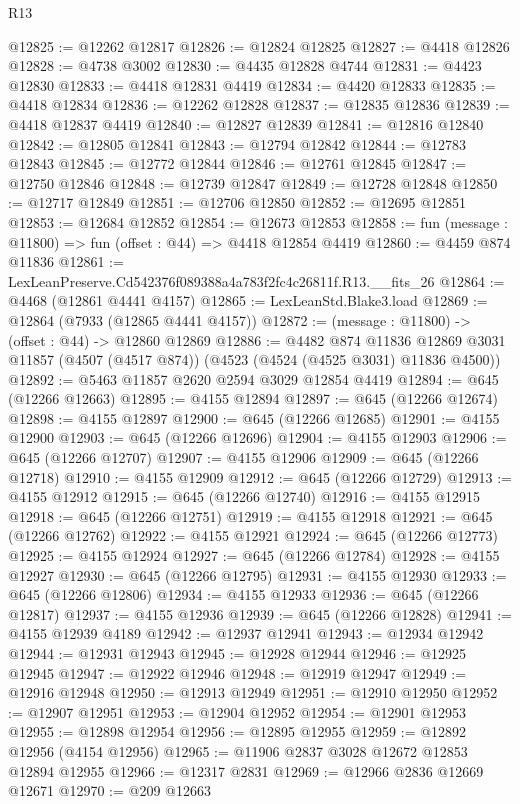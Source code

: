 \begin{lexlean}{R13}
\begin{coremodule}
@12825 := @12262 @12817
@12826 := @12824 @12825
@12827 := @4418 @12826
@12828 := @4738 @3002
@12830 := @4435 @12828 @4744
@12831 := @4423 @12830
@12833 := @4418 @12831 @4419
@12834 := @4420 @12833
@12835 := @4418 @12834
@12836 := @12262 @12828
@12837 := @12835 @12836
@12839 := @4418 @12837 @4419
@12840 := @12827 @12839
@12841 := @12816 @12840
@12842 := @12805 @12841
@12843 := @12794 @12842
@12844 := @12783 @12843
@12845 := @12772 @12844
@12846 := @12761 @12845
@12847 := @12750 @12846
@12848 := @12739 @12847
@12849 := @12728 @12848
@12850 := @12717 @12849
@12851 := @12706 @12850
@12852 := @12695 @12851
@12853 := @12684 @12852
@12854 := @12673 @12853
@12858 := fun (message : @11800) => fun (offset : @44) => @4418 @12854 @4419
@12860 := @4459 @874 @11836
@12861 := LexLeanPreserve.Cd542376f089388a4a783f2fc4c26811f.R13.__fits_26
@12864 := @4468 (@12861 @4441 @4157)
@12865 := LexLeanStd.Blake3.load
@12869 := @12864 (@7933 (@12865 @4441 @4157))
@12872 := (message : @11800) -> (offset : @44) -> @12860 @12869
@12886 := @4482
    @874
    @11836
    @12869
    @3031
    @11857
    (@4507 (@4517 @874))
    (@4523 (@4524 (@4525 @3031) @11836 @4500))
@12892 := @5463 @11857 @2620 @2594 @3029 @12854 @4419
@12894 := @645 (@12266 @12663)
@12895 := @4155 @12894
@12897 := @645 (@12266 @12674)
@12898 := @4155 @12897
@12900 := @645 (@12266 @12685)
@12901 := @4155 @12900
@12903 := @645 (@12266 @12696)
@12904 := @4155 @12903
@12906 := @645 (@12266 @12707)
@12907 := @4155 @12906
@12909 := @645 (@12266 @12718)
@12910 := @4155 @12909
@12912 := @645 (@12266 @12729)
@12913 := @4155 @12912
@12915 := @645 (@12266 @12740)
@12916 := @4155 @12915
@12918 := @645 (@12266 @12751)
@12919 := @4155 @12918
@12921 := @645 (@12266 @12762)
@12922 := @4155 @12921
@12924 := @645 (@12266 @12773)
@12925 := @4155 @12924
@12927 := @645 (@12266 @12784)
@12928 := @4155 @12927
@12930 := @645 (@12266 @12795)
@12931 := @4155 @12930
@12933 := @645 (@12266 @12806)
@12934 := @4155 @12933
@12936 := @645 (@12266 @12817)
@12937 := @4155 @12936
@12939 := @645 (@12266 @12828)
@12941 := @4155 @12939 @4189
@12942 := @12937 @12941
@12943 := @12934 @12942
@12944 := @12931 @12943
@12945 := @12928 @12944
@12946 := @12925 @12945
@12947 := @12922 @12946
@12948 := @12919 @12947
@12949 := @12916 @12948
@12950 := @12913 @12949
@12951 := @12910 @12950
@12952 := @12907 @12951
@12953 := @12904 @12952
@12954 := @12901 @12953
@12955 := @12898 @12954
@12956 := @12895 @12955
@12959 := @12892 @12956 (@4154 @12956)
@12965 := @11906 @2837 @3028 @12672 @12853 @12894 @12955
@12966 := @12317 @2831
@12969 := @12966 @2836 @12669 @12671
@12970 := @209 @12663

\end{coremodule}
\end{lexlean}

